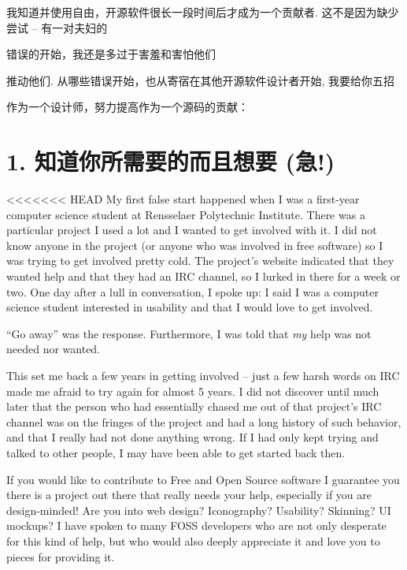﻿


\noindent{}我知道并使用自由，开源软件很长一段时间后才成为一个贡献者. 这不是因为缺少尝试 -- 有一对夫妇的

错误的开始，我还是多过于害羞和害怕他们

推动他们. 从哪些错误开始，也从寄宿在其他开源软件设计者开始, 我要给你五招

作为一个设计师，努力提高作为一个源码的贡献：
\section*{1. 知道你所需要的而且想要 (急!)}

<<<<<<< HEAD
My first false start happened when I was a first-year computer science student
at Rensselaer Polytechnic Institute. There was a particular project I used a lot
and I wanted to get involved with it. I did not know anyone in the project (or
anyone who was involved in free software) so I was trying to get involved pretty
cold. The project's website indicated that they wanted help and that they had an
IRC channel, so I lurked in there for a week or two. One day after a lull in
conversation, I spoke up: I said I was a computer science student interested in
usability and that I would love to get involved.

``Go away'' was the response. Furthermore, I was told that \emph{my} help was not
needed nor wanted. 

This set me back a few years in getting involved -- just a few harsh words on IRC
made me afraid to try again for almost 5 years.  I did not discover until much
later that the person who had essentially chased me out of that project's IRC
channel was on the fringes of the project and had a long history of such
behavior, and that I really had not done anything wrong. If I had only kept
trying and talked to other people, I may have been able to get started back
then.

If you would like to contribute to Free and Open Source software I guarantee you
there is a project out there that really needs your help, especially if you are
design-minded! Are you into web design? Iconography? Usability? Skinning? UI
mockups? I have spoken to many FOSS developers who are not only desperate for
this kind of help, but who would also deeply appreciate it and love you to
pieces for providing it.

